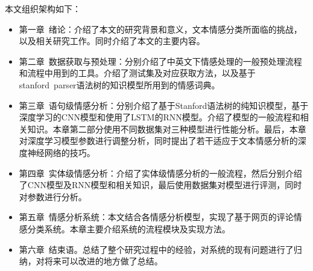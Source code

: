 本文组织架构如下：
\begin{itemize}
\item 第一章\ 绪论：介绍了本文的研究背景和意义，文本情感分类所面临的挑战，以及相关研究工作。同时介绍了本文的主要内容。
\item 第二章\ 数据获取与预处理：分别介绍了中英文下情感处理的一般预处理流程和流程中用到的工具。介绍了测试集及对应获取方法，以及基于stanford\ parser语法树的知识模型所用到的情感词典。
\item 第三章\ 语句级情感分析：分别介绍了基于Stanford语法树的纯知识模型，基于深度学习的CNN模型和使用了LSTM的RNN模型。介绍了模型的一般流程和相关知识。本章第二部分使用不同数据集对三种模型进行性能分析。最后，本章对深度学习模型参数进行调整分析，同时提出了若干适应于文本情感分析的深度神经网络的技巧。
\item 第四章\ 实体级情感分析：介绍了实体级情感分析的一般流程，然后分别介绍了CNN模型及RNN模型和相关知识，最后使用数据集对模型进行评测，同时对参数进行分析。
\item 第五章\ 情感分析系统：本文结合各情感分析模型，实现了基于网页的评论情感分类系统。本章主要介绍系统的流程模块及实现方法。
\item 第六章\ 结束语。总结了整个研究过程中的经验，对系统的现有问题进行了归纳，对将来可以改进的地方做了总结。
\end{itemize}